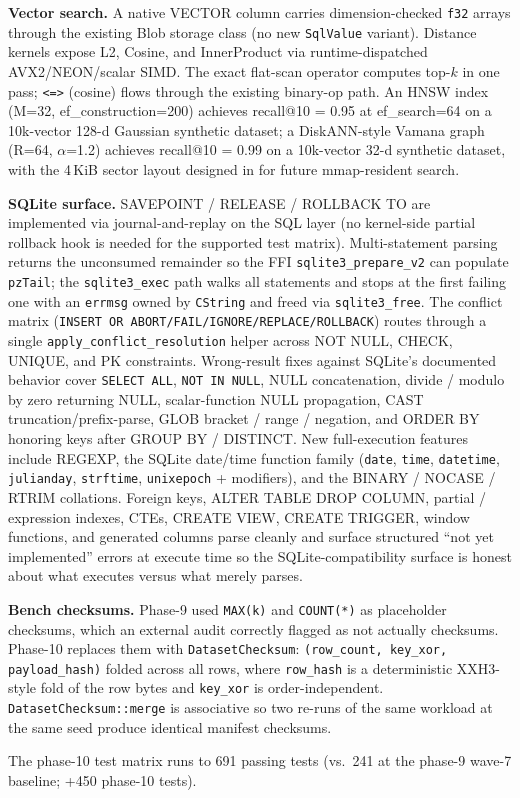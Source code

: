 \textbf{Vector search.} A native VECTOR column carries
dimension-checked \texttt{f32} arrays through the existing Blob
storage class (no new \texttt{SqlValue} variant). Distance kernels
expose L2, Cosine, and InnerProduct via runtime-dispatched
AVX2/NEON/scalar SIMD. The exact flat-scan operator computes top-$k$
in one pass; \texttt{<=>} (cosine) flows through the existing
binary-op path. An HNSW
index~\cite{malkov2018hnsw} (M=32, ef\_construction=200) achieves
recall@10 = 0.95 at ef\_search=64 on a 10k-vector 128-d Gaussian
synthetic dataset; a DiskANN-style Vamana
graph~\cite{subramanya2019diskann} (R=64, $\alpha$=1.2) achieves
recall@10 = 0.99 on a 10k-vector 32-d synthetic dataset, with the
4\,KiB sector layout designed in for future mmap-resident search.

\textbf{SQLite surface.} SAVEPOINT / RELEASE / ROLLBACK TO are
implemented via journal-and-replay on the SQL layer (no kernel-side
partial rollback hook is needed for the supported test matrix).
Multi-statement parsing returns the unconsumed remainder so the FFI
\texttt{sqlite3\_prepare\_v2} can populate \texttt{pzTail}; the
\texttt{sqlite3\_exec} path walks all statements and stops at the
first failing one with an \texttt{errmsg} owned by \texttt{CString}
and freed via \texttt{sqlite3\_free}. The conflict matrix
(\texttt{INSERT OR ABORT/FAIL/IGNORE/REPLACE/ROLLBACK}) routes through
a single \texttt{apply\_conflict\_resolution} helper across NOT NULL,
CHECK, UNIQUE, and PK constraints. Wrong-result fixes against
SQLite's documented behavior cover \texttt{SELECT ALL},
\texttt{NOT IN NULL}, NULL concatenation, divide / modulo by zero
returning NULL, scalar-function NULL propagation, CAST
truncation/prefix-parse, GLOB bracket / range / negation, and
ORDER BY honoring keys after GROUP BY / DISTINCT. New full-execution
features include REGEXP, the SQLite date/time function family
(\texttt{date}, \texttt{time}, \texttt{datetime}, \texttt{julianday},
\texttt{strftime}, \texttt{unixepoch} + modifiers), and the BINARY /
NOCASE / RTRIM collations. Foreign keys, ALTER TABLE DROP COLUMN,
partial / expression indexes, CTEs, CREATE VIEW, CREATE TRIGGER,
window functions, and generated columns parse cleanly and surface
structured ``not yet implemented'' errors at execute time so the
SQLite-compatibility surface is honest about what executes versus
what merely parses.

\textbf{Bench checksums.} Phase-9 used \texttt{MAX(k)} and
\texttt{COUNT(*)} as placeholder checksums, which an external audit
correctly flagged as not actually checksums. Phase-10 replaces them
with \texttt{DatasetChecksum}: \texttt{(row\_count, key\_xor,
payload\_hash)} folded across all rows, where \texttt{row\_hash} is
a deterministic XXH3-style fold of the row bytes and \texttt{key\_xor}
is order-independent. \texttt{DatasetChecksum::merge} is associative
so two re-runs of the same workload at the same seed produce
identical manifest checksums.

The phase-10 test matrix runs to 691 passing tests (vs.\ 241 at the
phase-9 wave-7 baseline; +450 phase-10 tests).
